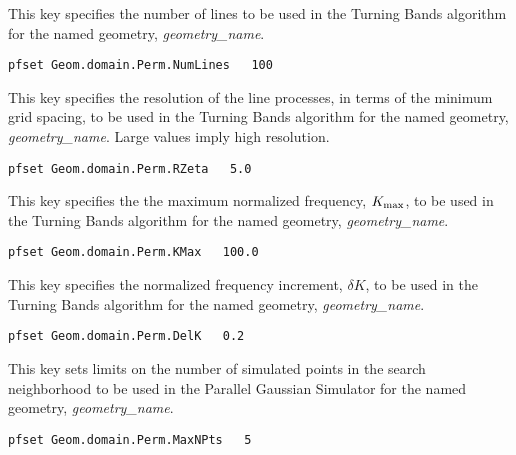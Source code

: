 {
This key specifies the number of lines to be used in the Turning Bands
algorithm for the named geometry, {\em geometry\_name}.
}
\begin{display}\begin{verbatim}
pfset Geom.domain.Perm.NumLines   100
\end{verbatim}\end{display}

{
This key specifies the resolution of the line processes, in terms of the
minimum grid spacing, to be used in the Turning Bands algorithm for the
named geometry, {\em geometry\_name}.  Large values imply high resolution.
}
\begin{display}\begin{verbatim}
pfset Geom.domain.Perm.RZeta   5.0
\end{verbatim}\end{display}

{
This key specifies the the maximum normalized frequency, $K_{\rm max}$,
to be used in the Turning Bands algorithm for the named geometry,
{\em geometry\_name}.
}
\begin{display}\begin{verbatim}
pfset Geom.domain.Perm.KMax   100.0
\end{verbatim}\end{display}

{
This key specifies the normalized frequency increment, $\delta K$, to be
used in the Turning Bands algorithm for the named geometry,
{\em geometry\_name}.
}
\begin{display}\begin{verbatim}
pfset Geom.domain.Perm.DelK   0.2
\end{verbatim}\end{display}

{
This key sets limits on the number of simulated points in the search
neighborhood to be used in the Parallel Gaussian Simulator for the named
geometry, {\em geometry\_name}.
}
\begin{display}\begin{verbatim}
pfset Geom.domain.Perm.MaxNPts   5
\end{verbatim}\end{display}

